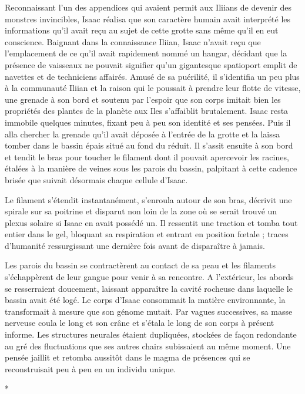 \documentclass[12pt]{book}
\newcommand{\s}{\begin{center}
*
\end{center}
}
\begin{document}
Reconnaissant l'un des appendices qui avaient permit aux Iliians de devenir des monstres invincibles, Isaac réalisa que son caractère humain avait interprété les informations qu'il avait reçu au sujet de cette grotte sans même qu'il en eut conscience. Baignant dans la connaissance Iliian, Isaac n'avait reçu que l'emplacement de ce qu'il avait rapidement nommé un hangar, décidant que la présence de vaisseaux ne pouvait signifier qu'un gigantesque spatioport emplit de navettes et de techniciens affairés. Amusé de sa puérilité, il s'identifia un peu plus à la communauté Iliian et la raison qui le poussait à prendre leur flotte de vitesse, une grenade à son bord et soutenu par l'espoir que son corps imitait bien les propriétés des plantes de la planète aux Iles s'affaiblit brutalement. Isaac resta immobile quelques minutes, fixant peu à peu son identité et ses pensées. Puis il alla chercher la grenade qu'il avait déposée à l'entrée de la grotte et la laissa tomber dans le bassin épais situé au fond du réduit. Il s'assit ensuite à son bord et tendit le bras pour toucher le filament dont il pouvait apercevoir les racines, étalées à la manière de veines sous les parois du bassin, palpitant à cette cadence brisée que suivait désormais chaque cellule d'Isaac.


Le filament s'étendit instantanément, s'enroula autour de son bras, décrivit une spirale sur sa poitrine et disparut non loin de la zone où se serait trouvé un plexus solaire si Isaac en avait possédé un. Il ressentit une traction et tomba tout entier dans le gel, bloquant sa respiration et entrant en position fœtale ; traces d'humanité ressurgissant une dernière fois avant de disparaître à jamais.


Les parois du bassin se contractèrent au contact de sa peau et les filaments s'échappèrent de leur gangue pour venir à sa rencontre. A l'extérieur, les abords se resserraient doucement, laissant apparaître la cavité rocheuse dans laquelle le bassin avait été logé. Le corps d'Isaac consommait la matière environnante, la transformait à mesure que son génome mutait. Par vagues successives, sa masse nerveuse coula le long et son crâne et s'étala le long de son corps à présent informe. Les structures neurales étaient dupliquées, stockées de façon redondante au gré des fluctuations que ses autres chairs subissaient au même moment. Une pensée jaillit et retomba aussitôt dans le magma de présences qui se reconstruisait peu à peu en un individu unique.


\s
\end{document}

